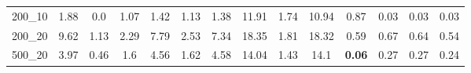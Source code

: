 \begin{tabular}{c|ccccccccccccc}
200\_10      & 1.88         & 0.0          & 1.07         & 1.42         & 1.13         & 1.38         & 11.91        & 1.74         & 10.94        & 0.87         & 0.03         & 0.03         & 0.03         \\ 
200\_20      & 9.62         & 1.13         & 2.29         & 7.79         & 2.53         & 7.34         & 18.35        & 1.81         & 18.32        & 0.59         & 0.67         & 0.64         & 0.54         \\ 
500\_20      & 3.97         & 0.46         & 1.6          & 4.56         & 1.62         & 4.58         & 14.04        & 1.43         & 14.1         & {\bf 0.06}   & 0.27         & 0.27         & 0.24         \\ 
\end{tabular}